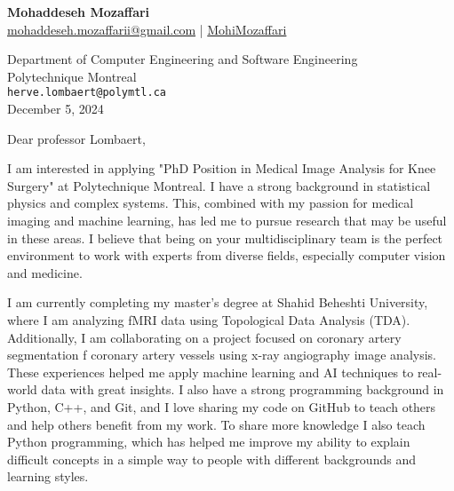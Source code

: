 \documentclass[letterpaper,11pt]{letter}
\begin{document}
\begin{center}
    \textbf{\Huge Mohaddeseh Mozaffari} \\
    \small{\href{mailto:mohaddeseh.mozaffarii@gmail.com}{ mohaddeseh.mozaffarii@gmail.com} | 	\href{https://www.linkedin.com/in/MohiMozaffari/}{ MohiMozaffari}}
\end{center}

\vspace{1em}

\begin{flushleft}
    Department of Computer Engineering and Software Engineering\\
    Polytechnique Montreal\\
    \texttt{herve.lombaert@polymtl.ca} \\
    December 5, 2024
\end{flushleft}

\vspace{1em}

\begin{flushleft}
    Dear professor Lombaert,
\end{flushleft}

\vspace{1em}

I am interested in applying "PhD Position in Medical Image Analysis for Knee Surgery" at Polytechnique Montreal. I have a strong background in statistical physics and complex systems. This, combined with my passion for medical imaging and machine learning, has led me to pursue research that may be useful in these areas. I believe that being on your multidisciplinary team is the perfect environment to work with experts from diverse fields, especially computer vision and medicine.

I am currently completing my master's degree at Shahid Beheshti University, where I am analyzing fMRI data using Topological Data Analysis (TDA). Additionally, I am collaborating on a project focused on coronary artery segmentation f coronary artery vessels using x-ray angiography image analysis. These experiences helped me apply machine learning and AI techniques to real-world data with great insights. I also have a strong programming background in Python, C++, and Git, and I love sharing my code on GitHub to teach others and help others benefit from my work. To share more knowledge I also teach Python programming, which has helped me improve my ability to explain difficult concepts in a simple way to people with different backgrounds and learning styles.
\end{document}

